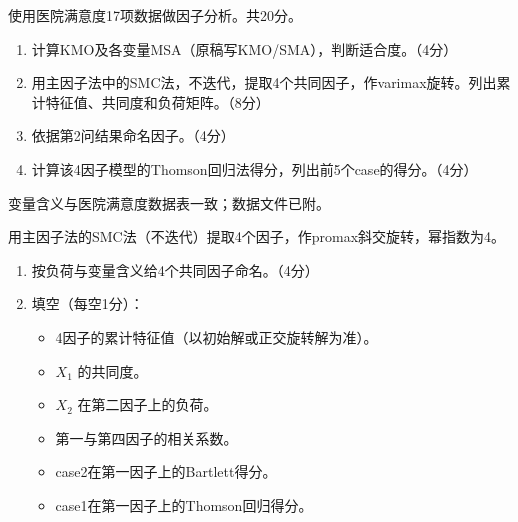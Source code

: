 \par\addvspace{6pt}\noindent\begin{minipage}{\linewidth}


使用医院满意度17项数据做因子分析。共20分。

\begin{enumerate}
\def\labelenumi{\arabic{enumi}.}
\tightlist
\item
  计算KMO及各变量MSA（原稿写KMO/SMA），判断适合度。（4分）
\item
  用主因子法中的SMC法，不迭代，提取4个共同因子，作varimax旋转。列出累计特征值、共同度和负荷矩阵。（8分）
\item
  依据第2问结果命名因子。（4分）
\item
  计算该4因子模型的Thomson回归法得分，列出前5个case的得分。（4分）
\end{enumerate}

变量含义与医院满意度数据表一致；数据文件已附。



\end{minipage}\par\vspace{4pt}

\par\addvspace{6pt}\noindent\begin{minipage}{\linewidth}


用主因子法的SMC法（不迭代）提取4个因子，作promax斜交旋转，幂指数为4。

\begin{enumerate}
\def\labelenumi{\arabic{enumi}.}
\tightlist
\item
  按负荷与变量含义给4个共同因子命名。（4分）
\item
  填空（每空1分）：

  \begin{itemize}
  \tightlist
  \item
    4因子的累计特征值（以初始解或正交旋转解为准）。
  \item
    \(X_1\) 的共同度。
  \item
    \(X_2\) 在第二因子上的负荷。
  \item
    第一与第四因子的相关系数。
  \item
    case2在第一因子上的Bartlett得分。
  \item
    case1在第一因子上的Thomson回归得分。
  \end{itemize}
\end{enumerate}



\end{minipage}\par\vspace{4pt}

